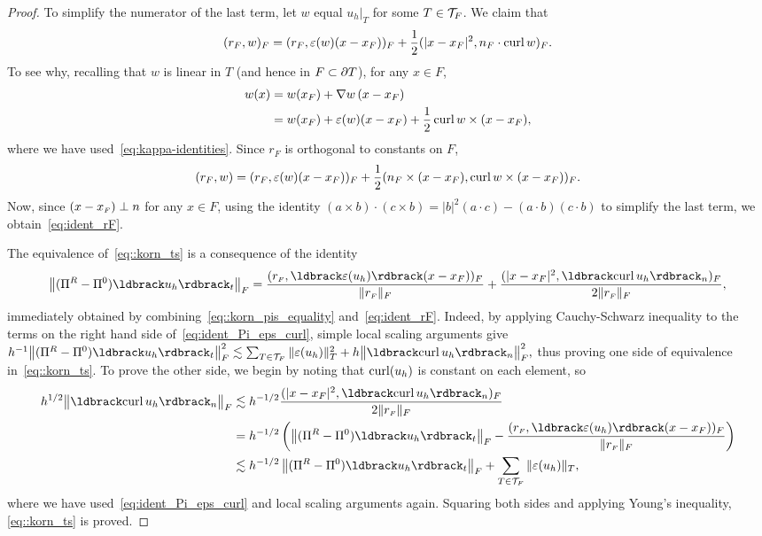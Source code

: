 \begin{proof}
  To  simplify the numerator of the last term,
  let $w$ equal $u_h|_T$ for some $T \in \mathcal{T}_F$. We claim
  that
  \begin{equation}
    \label{eq:ident_rF}
    (r_F, w)_F
    = (r_F, {\varepsilon}(w) (x - x_F))_F + \frac 1 2 (|x - x_F|^2, n_F \cdot \operatorname{curl} w)_F.
  \end{equation}
  To see why, recalling that $w$ is linear in $T$ (and hence in $F \subset \partial T$), for any $x \in F$, 
  \begin{align*}
    w(x) & = w(x_F) + \nabla w\, ( x- x_F)
    \\
    & = w(x_F) + {\varepsilon}(w) (x- x_F) + \frac 1 2 \operatorname{curl} w \times (x-x_F),
  \end{align*}
  where we have used~\eqref{eq:kappa-identities}. Since $r_F$ is
  orthogonal to constants on $F$,
  \[
    (r_F, w) =
    (r_F, {\varepsilon}(w) (x - x_F))_F + \frac 1 2
    (n_F \times (x - x_F),  \operatorname{curl} w \times (x - x_F))_F.
  \]
  Now, since $(x-{x_{\scriptscriptstyle F}})\perp n$ for any $x \in F$, using the identity
  $(a\times b) \cdot (c\times b) = |b|^2(a\cdot c) - (a\cdot b)(c\cdot
  b)$ to simplify the  last term, we obtain~\eqref{eq:ident_rF}.

  The equivalence of~\eqref{eq::korn_ts} is a consequence of  the identity 
  \begin{equation}
    \label{eq:ident_Pi_eps_curl}
    \big\|(\PiR-\Pi^0)\jump{u_h}_t\big\|_F
    = \frac{(\rF, \jump{\veps(u_h)} (x - x_F))_F}{\|\rF\|_F}
    + \frac{( |x - x_F|^2, \jump{\curl u_h}_n )_F}{2\|\rF\|_F},    
  \end{equation}
  immediately obtained by combining~\eqref{eq::korn_pis_equality}
  and~\eqref{eq:ident_rF}. Indeed, by applying Cauchy-Schwarz
  inequality to the terms on the right hand side
  of~\eqref{eq:ident_Pi_eps_curl}, simple local scaling arguments give
  $h^{-1}\big\|(\PiR-\Pi^0)\jump{u_h}_t\big\|_F^2 \lesssim \sum_{T \in
    \T_F} \| \veps(u_h) \|_T^2 + h\big\|\jump{\curl u_h}_n\big\|_F^2,
  $ thus proving one side of equivalence in~\eqref{eq::korn_ts}. To prove
  the other side, we begin by 
  noting that $\operatorname{curl} (u_h)$ is constant on each element, so
  \begin{align*}
    h^{1/2} \big\|\jump{\curl u_h}_n\big\|_F
      & \lesssim  h^{-1/2}
        \frac{( |x - x_F|^2, \jump{\curl u_h}_n )_F}{2\|\rF\|_F}
    \\
      & = h^{-1/2} \left(
        \big\|(\PiR-\Pi^0)\jump{u_h}_t\big\|_F
        - \frac{(\rF, \jump{\veps(u_h)} (x - x_F))_F}{\|\rF\|_F}
        \right)
    \\
      & \lesssim
        h^{-1/2} \left\|(\PiR-\Pi^0)\jump{u_h}_t\right\|_F
        +\sum_{T \in \T_F}\|\eps(u_h)\|_T,
  \end{align*}
  where we have used~\eqref{eq:ident_Pi_eps_curl} and local scaling
  arguments again.  Squaring both sides and applying Young's
  inequality, \eqref{eq::korn_ts} is
  proved.
  \qqed
\end{proof}




